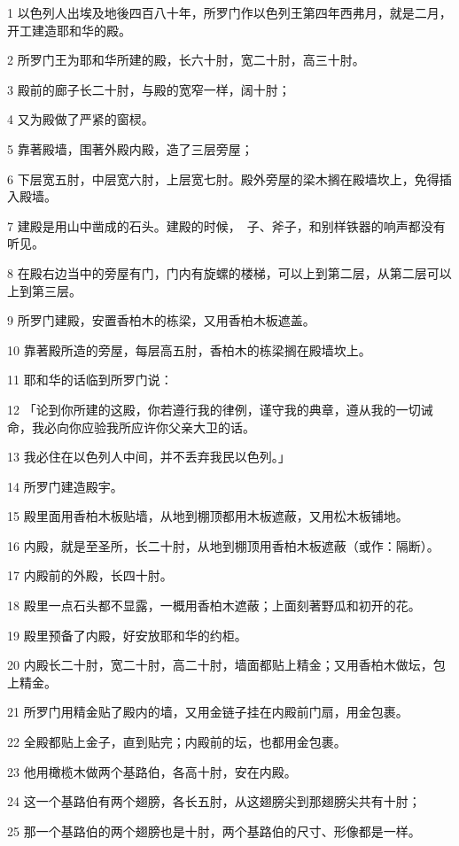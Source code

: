 \par 1 以色列人出埃及地後四百八十年，所罗门作以色列王第四年西弗月，就是二月，开工建造耶和华的殿。
\par 2 所罗门王为耶和华所建的殿，长六十肘，宽二十肘，高三十肘。
\par 3 殿前的廊子长二十肘，与殿的宽窄一样，阔十肘；
\par 4 又为殿做了严紧的窗棂。
\par 5 靠著殿墙，围著外殿内殿，造了三层旁屋；
\par 6 下层宽五肘，中层宽六肘，上层宽七肘。殿外旁屋的梁木搁在殿墙坎上，免得插入殿墙。
\par 7 建殿是用山中凿成的石头。建殿的时候，　子、斧子，和别样铁器的响声都没有听见。
\par 8 在殿右边当中的旁屋有门，门内有旋螺的楼梯，可以上到第二层，从第二层可以上到第三层。
\par 9 所罗门建殿，安置香柏木的栋梁，又用香柏木板遮盖。
\par 10 靠著殿所造的旁屋，每层高五肘，香柏木的栋梁搁在殿墙坎上。
\par 11 耶和华的话临到所罗门说：
\par 12 「论到你所建的这殿，你若遵行我的律例，谨守我的典章，遵从我的一切诫命，我必向你应验我所应许你父亲大卫的话。
\par 13 我必住在以色列人中间，并不丢弃我民以色列。」
\par 14 所罗门建造殿宇。
\par 15 殿里面用香柏木板贴墙，从地到棚顶都用木板遮蔽，又用松木板铺地。
\par 16 内殿，就是至圣所，长二十肘，从地到棚顶用香柏木板遮蔽（或作：隔断）。
\par 17 内殿前的外殿，长四十肘。
\par 18 殿里一点石头都不显露，一概用香柏木遮蔽；上面刻著野瓜和初开的花。
\par 19 殿里预备了内殿，好安放耶和华的约柜。
\par 20 内殿长二十肘，宽二十肘，高二十肘，墙面都贴上精金；又用香柏木做坛，包上精金。
\par 21 所罗门用精金贴了殿内的墙，又用金链子挂在内殿前门扇，用金包裹。
\par 22 全殿都贴上金子，直到贴完；内殿前的坛，也都用金包裹。
\par 23 他用橄榄木做两个基路伯，各高十肘，安在内殿。
\par 24 这一个基路伯有两个翅膀，各长五肘，从这翅膀尖到那翅膀尖共有十肘；
\par 25 那一个基路伯的两个翅膀也是十肘，两个基路伯的尺寸、形像都是一样。
